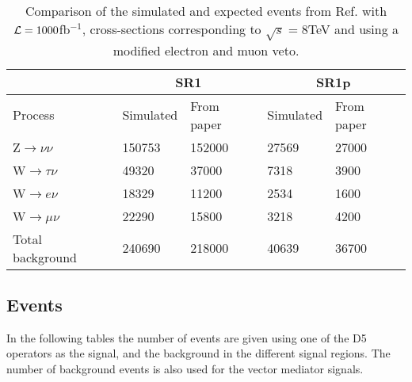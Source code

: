 \begin{table}[ht]
\begin{center}
\begin{tabular}{|l|l|l|l|l|}
\hline
& \multicolumn{2}{c}{SR1} & \multicolumn{2}{|c|}{SR1p} \\
\hline
Process & Simulated  & From paper & Simulated & From paper  \\ \hline
Z$\rightarrow\nu\nu$ & 150753 & 152000 & 27569 & 27000 \\
W$\rightarrow\tau\nu$ & 49320 & 37000 & 7318 & 3900 \\
W$\rightarrow e\nu$ & 18329 & 11200 & 2534 & 1600 \\
W$\rightarrow\mu\nu$ & 22290 & 15800 & 3218 & 4200 \\ \hline
Total background & 240690 & 218000 & 40639 & 36700 \\ \hline
\end{tabular}
\caption{Comparison of the simulated and expected events from Ref. \citep{ATLAS-CONF-2012-147} with $\mathcal{L}=1000$fb$^{-1}$, cross-sections corresponding to $\sqrt{s}=8$TeV and using a modified electron and muon veto.}
\label{tab:newcomp}
\end{center}
\end{table}


\subsection{Events}
In the following tables the number of events are given using one of the D5 operators as the signal, and the background in the different signal regions. The number of background events is also used for the vector mediator signals.

